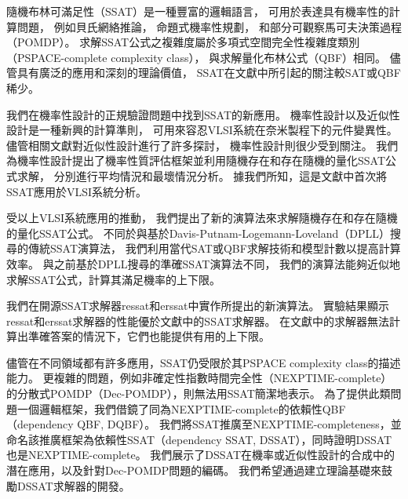 
隨機布林可滿足性（SSAT）是一種豐富的邏輯語言，
可用於表達具有機率性的計算問題，
例如貝氏網絡推論，
命題式機率性規劃，
和部分可觀察馬可夫決策過程（POMDP）。
求解SSAT公式之複雜度屬於多項式空間完全性複雜度類別（PSPACE-complete complexity class），
與求解量化布林公式（QBF）相同。
儘管具有廣泛的應用和深刻的理論價值，
SSAT在文獻中所引起的關注較SAT或QBF稀少。

我們在機率性設計的正規驗證問題中找到SSAT的新應用。
機率性設計以及近似性設計是一種新興的計算準則，
可用來容忍VLSI系統在奈米製程下的元件變異性。
儘管相關文獻對近似性設計進行了許多探討，
機率性設計則很少受到關注。
我們為機率性設計提出了機率性質評估框架並利用隨機存在和存在隨機的量化SSAT公式求解，
分別進行平均情況和最壞情況分析。
據我們所知，這是文獻中首次將SSAT應用於VLSI系統分析。

受以上VLSI系統應用的推動，
我們提出了新的演算法來求解隨機存在和存在隨機的量化SSAT公式。
不同於與基於Davis-Putnam-Logemann-Loveland（DPLL）搜尋的傳統SSAT演算法，
我們利用當代SAT或QBF求解技術和模型計數以提高計算效率。
與之前基於DPLL搜尋的準確SSAT演算法不同，
我們的演算法能夠近似地求解SSAT公式，計算其滿足機率的上下限。

我們在開源SSAT求解器ressat和erssat中實作所提出的新演算法。
實驗結果顯示ressat和erssat求解器的性能優於文獻中的SSAT求解器。
在文獻中的求解器無法計算出準確答案的情況下，它們也能提供有用的上下限。

儘管在不同領域都有許多應用，SSAT仍受限於其PSPACE complexity class的描述能力。
更複雜的問題，例如非確定性指數時間完全性（NEXPTIME-complete）的分散式POMDP（Dec-POMDP），則無法用SSAT簡潔地表示。
為了提供此類問題一個邏輯框架，我們借鏡了同為NEXPTIME-complete的依賴性QBF（dependency QBF, DQBF）。
我們將SSAT推廣至NEXPTIME-completeness，並命名該推廣框架為依賴性SSAT（dependency SSAT, DSSAT），同時證明DSSAT也是NEXPTIME-complete。
我們展示了DSSAT在機率或近似性設計的合成中的潛在應用，以及針對Dec-POMDP問題的編碼。
我們希望通過建立理論基礎來鼓勵DSSAT求解器的開發。